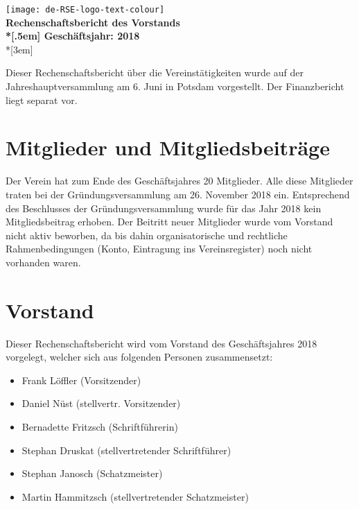 \newcommand{\jahr}{2018}



\thispagestyle{empty}

\begin{centering}
\texttt{[image: de-RSE-logo-text-colour]}\\
\vspace{3em}
\textbf{
 \Large Rechenschaftsbericht des Vorstands\\*[.5em]
 \normalsize Geschäftsjahr: \jahr}\\*[3em]
\end{centering}



Dieser Rechenschaftsbericht über die Vereinstätigkeiten wurde auf der Jahreshauptversammlung am 6. Juni in Potsdam vorgestellt.
Der Finanzbericht liegt separat vor.

\section{Mitglieder und Mitgliedsbeiträge}

Der Verein hat zum Ende des Geschäftsjahres 20 Mitglieder.
Alle diese Mitglieder traten bei der Gründungsversammlung am 26. November 2018 ein.
Entsprechend des Beschlusses der Gründungsversammlung wurde für das Jahr 2018 kein Mitgliedsbeitrag erhoben.
Der Beitritt neuer Mitglieder wurde vom Vorstand nicht aktiv beworben, da bis dahin organisatorische und rechtliche Rahmenbedingungen (Konto, Eintragung ins Vereinsregister) noch nicht vorhanden waren.

\section{Vorstand}

Dieser Rechenschaftsbericht wird vom Vorstand des Geschäftsjahres 2018 vorgelegt, welcher sich aus folgenden Personen zusammensetzt:

\begin{itemize}
  \setlength{\itemsep}{0pt plus 1pt}
  \item Frank Löffler (Vorsitzender)
  \item Daniel Nüst (stellvertr. Vorsitzender)
  \item Bernadette Fritzsch (Schriftführerin)
  \item Stephan Druskat (stellvertretender Schriftführer)
  \item Stephan Janosch (Schatzmeister)
  \item Martin Hammitzsch (stellvertretender Schatzmeister)
\end{itemize}

